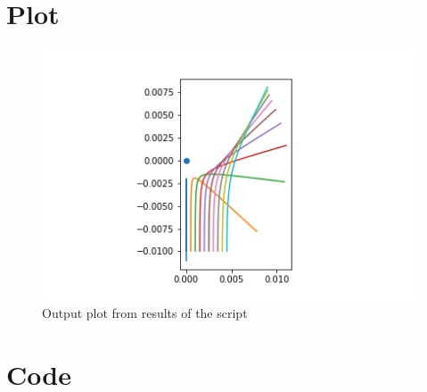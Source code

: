 \documentclass[a4paper,11pt]{article}
\begin{document}
\section{Plot}

\begin{figure}[H]
\centering
\includegraphics[width=1.0\textwidth]{RSA_Graph.png} 
\caption{Output plot from results of the script} 
\label{Plot}
\end{figure}

\section{Code}

\inputminted[breaklines,linenos]{python3}{RSA.py}
\end{document}
